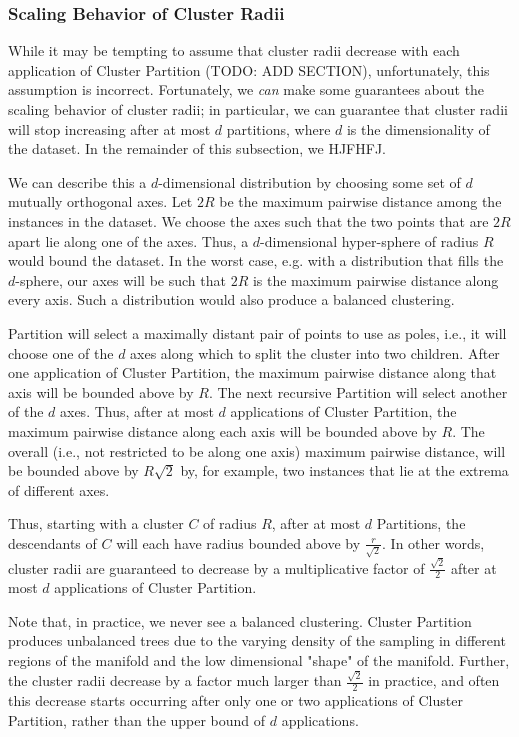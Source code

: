 \subsubsection {Scaling Behavior of Cluster Radii}
\label{subsubsec:methods:guaranteed-decrease-in-cluster-radii}
While it may be tempting to assume that cluster radii decrease with each application of Cluster Partition (TODO: ADD SECTION), unfortunately, this assumption is incorrect. 
Fortunately, we \emph{can} make some guarantees about the scaling behavior of cluster radii; in particular, we can guarantee that cluster radii will stop increasing after at most 
$d$ partitions, where $d$ is the dimensionality of the dataset.  In the remainder of this subsection, we HJFHFJ. 


We can describe this a $d$-dimensional distribution by choosing some set of $d$ mutually orthogonal axes.
Let $2R$ be the maximum pairwise distance among the instances in the dataset. 
We choose the axes such that the two points that are $2R$ apart lie along one of the axes. 
Thus, a $d$-dimensional hyper-sphere of radius $R$ would bound the dataset. 
In the worst case, e.g. with a distribution that fills the $d$-sphere, our axes will be such that $2R$ is the maximum pairwise distance along every axis. 
Such a distribution would also produce a balanced clustering.


Partition will select a maximally distant pair of points to use as poles, i.e., it will choose one of the $d$ axes along
which to split the cluster into two children. 
After one application of Cluster Partition, the maximum pairwise distance along that axis will be
bounded above by $R$. 
The next recursive Partition will select another of the $d$ axes. 
Thus, after at most $d$ applications of Cluster Partition, the
maximum pairwise distance along each axis will be bounded above by $R$. 
The overall (i.e., not restricted to be along one axis) maximum pairwise distance, 
will be bounded above by $R\sqrt{2}$ by, for example, two instances that lie at the extrema of different axes. 

Thus, starting with a cluster $C$ of radius $R$, after at most $d$ Partitions, the descendants of $C$ will each have radius
bounded above by $\frac{r}{\sqrt{2}}$. In other words, cluster radii are guaranteed to decrease by a multiplicative factor of $\frac{\sqrt{2}}{2}$ after at 
most $d$ applications of Cluster Partition. 


Note that, in practice, we never see a balanced clustering. Cluster Partition  produces unbalanced trees due to the varying density of the sampling 
in different regions of the manifold and the low dimensional "shape" of the manifold. Further, the cluster radii decrease by a factor much larger than 
$\frac{\sqrt{2}}{2}$ in practice, and often this decrease starts occurring after only one or two applications of Cluster Partition, rather than the 
upper bound of $d$ applications.

